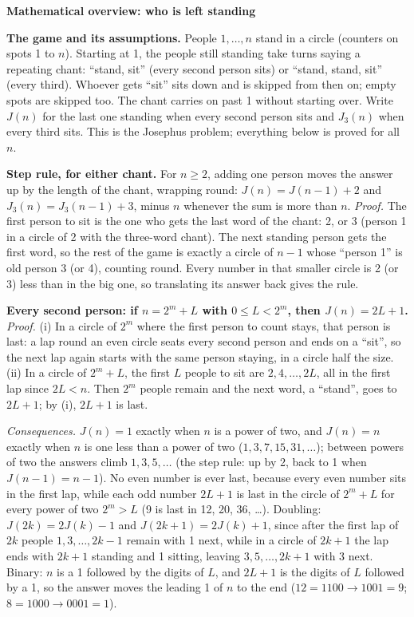 \documentclass[11pt]{article}
\newcommand{\head}[1]{\par\textbf{\large #1}\par}
\newcommand{\say}[1]{``#1''}
\begin{document}
\head{Mathematical overview: who is left standing}
\textbf{The game and its assumptions.} People $1,\dots,n$ stand in a circle (counters on spots 1 to $n$). Starting at 1, the people still standing take turns saying a repeating chant: \say{stand, sit} (every second person sits) or \say{stand, stand, sit} (every third). Whoever gets \say{sit} sits down and is skipped from then on; empty spots are skipped too. The chant carries on past 1 without starting over. Write $J(n)$ for the last one standing when every second person sits and $J_3(n)$ when every third sits. This is the Josephus problem; everything below is proved for all $n$.

\textbf{Step rule, for either chant.} For $n\ge2$, adding one person moves the answer up by the length of the chant, wrapping round: $J(n)=J(n-1)+2$ and $J_3(n)=J_3(n-1)+3$, minus $n$ whenever the sum is more than $n$. \emph{Proof.} The first person to sit is the one who gets the last word of the chant: 2, or 3 (person 1 in a circle of 2 with the three-word chant). The next standing person gets the first word, so the rest of the game is exactly a circle of $n-1$ whose \say{person 1} is old person 3 (or 4), counting round. Every number in that smaller circle is 2 (or 3) less than in the big one, so translating its answer back gives the rule.

\textbf{Every second person: if $n=2^m+L$ with $0\le L<2^m$, then $J(n)=2L+1$.} \emph{Proof.} (i) In a circle of $2^m$ where the first person to count stays, that person is last: a lap round an even circle seats every second person and ends on a \say{sit}, so the next lap again starts with the same person staying, in a circle half the size. (ii) In a circle of $2^m+L$, the first $L$ people to sit are $2,4,\dots,2L$, all in the first lap since $2L<n$. Then $2^m$ people remain and the next word, a \say{stand}, goes to $2L+1$; by (i), $2L+1$ is last.

\emph{Consequences.} $J(n)=1$ exactly when $n$ is a power of two, and $J(n)=n$ exactly when $n$ is one less than a power of two ($1,3,7,15,31,\dots$); between powers of two the answers climb $1,3,5,\dots$ (the step rule: up by 2, back to 1 when $J(n-1)=n-1$). No even number is ever last, because every even number sits in the first lap, while each odd number $2L+1$ is last in the circle of $2^m+L$ for every power of two $2^m>L$ (9 is last in 12, 20, 36, \dots). Doubling: $J(2k)=2J(k)-1$ and $J(2k+1)=2J(k)+1$, since after the first lap of $2k$ people $1,3,\dots,2k-1$ remain with 1 next, while in a circle of $2k+1$ the lap ends with $2k+1$ standing and 1 sitting, leaving $3,5,\dots,2k+1$ with 3 next. Binary: $n$ is a 1 followed by the digits of $L$, and $2L+1$ is the digits of $L$ followed by a 1, so the answer moves the leading 1 of $n$ to the end ($12=1100\to1001=9$; $8=1000\to0001=1$).
\end{document}
